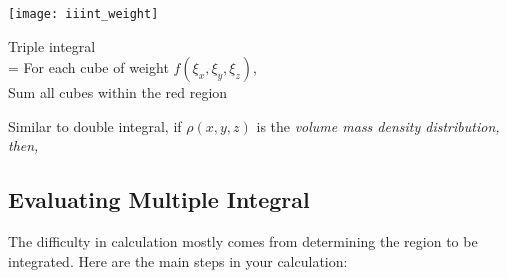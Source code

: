 \documentclass[class=article, crop=false, 12pt]{standalone}
\begin{document}
\begin{center}
    \begin{minipage}{0.4\textwidth}
        \texttt{[image: iiint\_weight]}
    \end{minipage}
    \hspace{0.05\textwidth}
    \begin{minipage}{0.5\textwidth}
        \centering
        \begin{framed}
            Triple integral \\
            = For each cube of weight $f(\xi_x,\xi_y, \xi_z)$,\\
            Sum all cubes within the red region
        \end{framed}
    \end{minipage}
\end{center}

Similar to double integral, if $\rho(x,y,z)$ is the \it{volume mass density distribution}, 
then, 


\subsection{Evaluating Multiple Integral}

The difficulty in calculation mostly comes from determining the region to be integrated.
Here are the main steps in your calculation:
\end{document}

